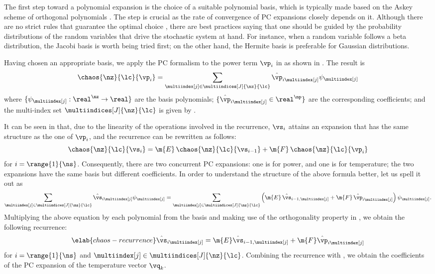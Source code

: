 The first step toward a polynomial expansion is the choice of a suitable
polynomial basis, which is typically made based on the Askey scheme of
orthogonal polynomials \cite{xiu2010}. The step is crucial as the rate of
convergence of \ac{PC} expansions closely depends on it. Although there are no
strict rules that guarantee the optimal choice \cite{knio2006}, there are best
practices saying that one should be guided by the probability distributions of
the random variables that drive the stochastic system at hand. For instance,
when a random variable follows a beta distribution, the Jacobi basis is worth
being tried first; on the other hand, the Hermite basis is preferable for
Gaussian distributions.

Having chosen an appropriate basis, we apply the \ac{PC} formalism to the power
term $\vp_i$ in  as shown in
. The result is
\[
  \chaos{\nz}{\lc}{\vp_i} = \sum_{\multiindex[j] \in \multiindices[J]{\nz}{\lc}} \hat{\vp}_{i \multiindex[j]} \psi_{\multiindex[j]}
\]
where $\{ \psi_{\multiindex[j]}: \real^\nz \to \real \}$ are the basis
polynomials; $\{ \hat{\vp}_{i \multiindex[j]} \in \real^\np \}$ are the
corresponding coefficients; and the multi-index set $\multiindices[J]{\nz}{\lc}$
is given by .

It can be seen in  that, due to the linearity of
the operations involved in the recurrence, $\vs_i$ attains an expansion that has
the same structure as the one of $\vp_i$, and the recurrence can be rewritten as
follows:
\[
  \chaos{\nz}{\lc}{\vs_i} = \m{E} \, \chaos{\nz}{\lc}{\vs_{i - 1}} + \m{F} \, \chaos{\nz}{\lc}{\vp_i}
\]
for $i = \range{1}{\ns}$. Consequently, there are two concurrent \ac{PC}
expansions: one is for power, and one is for temperature; the two expansions
have the same basis but different coefficients. In order to understand the
structure of the above formula better, let us spell it out as
\[
  \sum_{\multiindex[j] \in \multiindices[J]{\nz}{\lc}} \hat{\vs}_{i \multiindex[j]} \psi_{\multiindex[j]} =
  \sum_{\multiindex[j] \in \multiindices[J]{\nz}{\lc}} \left(\m{E} \, \hat{\vs}_{i - 1, \multiindex[j]} + \m{F} \, \hat{\vp}_{i \multiindex[j]}\right) \psi_{\multiindex[j]}.
\]
Multiplying the above equation by each polynomial from the basis and making use
of the orthogonality property in , we obtain the
following recurrence:
\begin{equation} \elab{chaos-recurrence}
  \hat{\vs}_{i \multiindex[j]} = \m{E} \hat{\vs}_{i - 1, \multiindex[j]} + \m{F} \hat{\vp}_{i \multiindex[j]}
\end{equation}
for $i = \range{1}{\ns}$ and $\multiindex[j] \in \multiindices[J]{\nz}{\lc}$.
Combining the recurrence with , we obtain the
coefficients of the \ac{PC} expansion of the temperature vector $\vq_k$.

